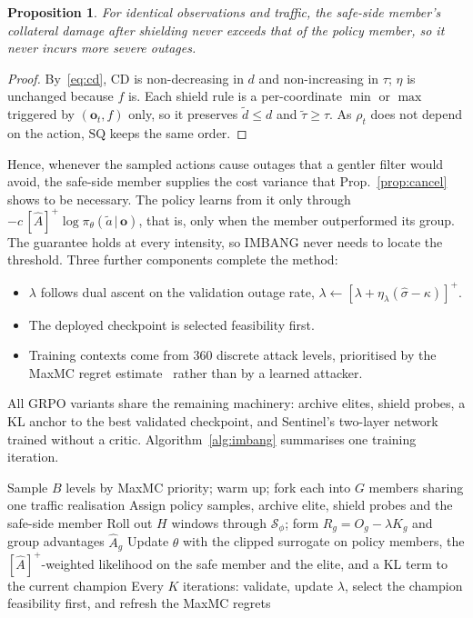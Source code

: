 \documentclass[journal]{IEEEtran}
\newtheorem{proposition}{Proposition}
\begin{document}
\begin{proposition}\label{prop:safe}
For identical observations and traffic, the safe-side member's collateral damage after shielding never exceeds that of the policy member, so it never incurs more severe outages.
\end{proposition}
\begin{proof}
By~\eqref{eq:cd}, $\mathrm{CD}$ is non-decreasing in $d$ and non-increasing in $\tau$; $\eta$ is unchanged because $f$ is. Each shield rule is a per-coordinate $\min$ or $\max$ triggered by $(\mathbf{o}_t,f)$ only, so it preserves $\tilde d\le d$ and $\tilde\tau\ge\tau$. As $\rho_t$ does not depend on the action, $\mathrm{SQ}$ keeps the same order.
\end{proof}

Hence, whenever the sampled actions cause outages that a gentler filter would avoid, the safe-side member supplies the cost variance that Prop.~\ref{prop:cancel} shows to be necessary. The policy learns from it only through $-c\,[\hat A]^+\log\pi_\theta(\tilde a\,|\,\mathbf{o})$, that is, only when the member outperformed its group. The guarantee holds at every intensity, so IMBANG never needs to locate the threshold. Three further components complete the method:
\begin{itemize}
\item $\lambda$ follows dual ascent on the validation outage rate, $\lambda\leftarrow[\lambda+\eta_\lambda(\hat\sigma-\kappa)]^+$.
\item The deployed checkpoint is selected feasibility first.
\item Training contexts come from 360 discrete attack levels, prioritised by the MaxMC regret estimate~\cite{jiang2021robustplr,jiang2021plr} rather than by a learned attacker.
\end{itemize}
All GRPO variants share the remaining machinery: archive elites, shield probes, a KL anchor to the best validated checkpoint, and Sentinel's two-layer network trained without a critic. Algorithm~\ref{alg:imbang} summarises one training iteration.

\begin{algorithm}[t]
\caption{One IMBANG training iteration}
\label{alg:imbang}
\small
\begin{algorithmic}[1]
\STATE Sample $B$ levels by MaxMC priority; warm up; fork each into $G$ members sharing one traffic realisation
\STATE Assign policy samples, archive elite, shield probes and the safe-side member
\STATE Roll out $H$ windows through $\mathcal{S}_\phi$; form $R_g=O_g-\lambda K_g$ and group advantages $\hat A_g$
\STATE Update $\theta$ with the clipped surrogate on policy members, the $[\hat A]^+$-weighted likelihood on the safe member and the elite, and a KL term to the current champion
\STATE Every $K$ iterations: validate, update $\lambda$, select the champion feasibility first, and refresh the MaxMC regrets
\end{algorithmic}
\end{algorithm}
\end{document}
